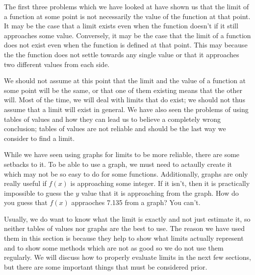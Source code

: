 \documentclass[12pt]{article}
\theoremstyle{definition}
\begin{document}
The first three problems which we have looked at have shown us that the limit of a function at some point is not necessarily the value of the function at that point.
It may be the case that a limit exists even when the function doesn't if it still approaches some value.
Conversely, it may be the case that the limit of a function does not exist even when the function is defined at that point.
This may because the the function does not settle towards any single value or that it approaches two different values from each side.

We should not assume at this point that the limit and the value of a function at some point will be the same, or that one of them existing means that the other will.
Most of the time, we will deal with limits that do exist; we should not thus assume that a limit will exist in general.
We have also seen the problems of using tables of values and how they can lead us to believe a completely wrong conclusion; tables of values are not reliable and should be the last way we consider to find a limit.

While we have seen using graphs for limits to be more reliable, there are some setbacks to it.
To be able to use a graph, we must need to actaully create it which may not be so easy to do for some functions.
Additionally, graphs are only really useful if $f(x)$ is approaching some integer.
If it isn't, then it is practically impossible to guess the $y$ value that it is approaching from the graph.
How do you guess that $f(x)$ appraoches 7.135 from a graph?
You can't.

Usually, we do want to know what the limit is exactly and not just estimate it, so neither tables of values nor graphs are the best to use.
The reason we have used them in this section is because they help to show what limits actually represent and to show some methods which are not as good so we do not use them regularly.
We will discuss how to properly evaluate limits in the next few sections, but there are some important things that must be considered prior.
\end{document}
